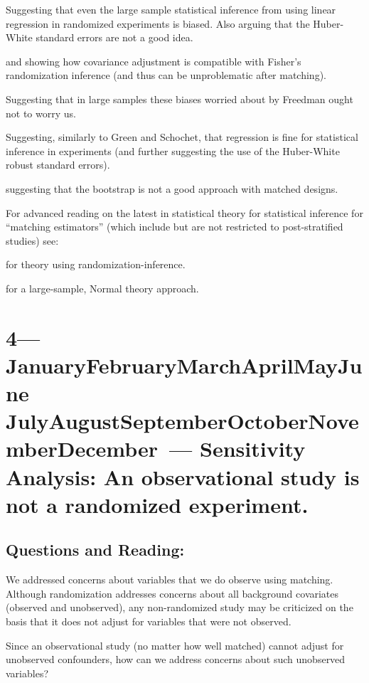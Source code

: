 \documentclass[10pt]{article}
\def\themonth{\ifcase\month\or
  January\or February\or March\or April\or May\or June\or
  July\or August\or September\or October\or November\or December\fi}
\begin{document}
\cite{freedman2008randomization,freedman2008rae,freedman2007rae,Free:2006:On-t}
Suggesting that even the large sample statistical inference from using
linear regression in randomized experiments is biased. Also arguing
that the Huber-White standard errors are not a good idea.

\cite{rosenbaum:2002a} and \cite{bowers2011fish} showing how
covariance adjustment is compatible with Fisher's randomization
inference (and thus can be unproblematic after matching).

\cite{schochet2009regression,green2009ec} Suggesting that in large
samples these biases worried about by Freedman ought not to worry
us. 

\citealp[Chap 6--8]{imbens2009causal} Suggesting, similarly to Green and
Schochet, that regression is fine for statistical inference in
experiments (and further suggesting the use of the Huber-White robust
standard errors).

\citealp{AbadImbe:2004:On-t} suggesting that the bootstrap is not a good
approach with matched designs.

For advanced reading on the latest in statistical theory for
statistical inference for ``matching estimators'' (which include but
are not restricted to post-stratified studies) see:

\cite{hansen2009prop} for theory using randomization-inference.

\cite{abadie2009matching} for a large-sample, Normal theory approach.


\AdvanceDate[1]
\section{4---\themonth~\the\day--- Sensitivity Analysis: An observational study is not a randomized experiment.}

\subsection{Questions and Reading:}

We addressed concerns about variables that we do observe using matching.
Although randomization addresses concerns about all background covariates
(observed and unobserved), any non-randomized study may be criticized on the
basis that it does not adjust for variables that were not observed.

Since an observational study (no matter how well matched) cannot adjust for
unobserved confounders, how can we address concerns about such unobserved
variables?
\end{document}
